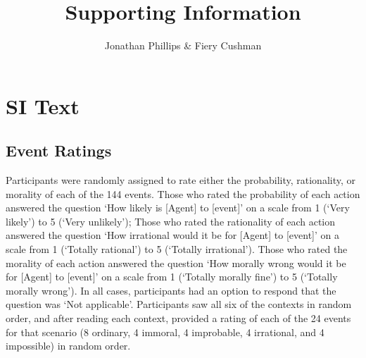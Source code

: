 \documentclass[11pt,letterpaper]{article}
\title{Supporting Information}
\author{Jonathan Phillips \& Fiery Cushman}
\date{}
\begin{document}
\maketitle

\section*{SI Text}

\subsection*{Event Ratings} Participants were randomly assigned to rate either the probability, rationality, or morality of each of the 144 events. Those who rated the probability of each action answered the question `How likely is [Agent] to [event]' on a scale from 1 (`Very likely') to 5 (`Very unlikely'); Those who rated the rationality of each action answered the question `How irrational would it be for [Agent] to [event]' on a scale from 1 (`Totally rational') to 5 (`Totally irrational'). Those who rated the morality of each action answered the question `How morally wrong would it be for [Agent] to [event]' on a scale from 1 (`Totally morally fine') to 5 (`Totally morally wrong'). In all cases, participants had an option to respond that the question was `Not applicable'. Participants saw all six of the contexts in random order, and after reading each context, provided a rating of each of the 24 events for that scenario (8 ordinary, 4 immoral, 4 improbable, 4 irrational, and 4 impossible) in random order.
\end{document}
